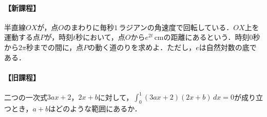 \documentclass[../../main.tex]{subfiles}
\begin{document}
\paragraph{【新課程】}
半直線$OX$が，点$O$のまわりに毎秒$1\,\text{ラジアン}$の角速度で回転している．$OX$上を運動する点$P$が，時刻$t$秒において，点$O$から$e^{2t}\,\text{cm}$の距離にあるという．時刻$0$秒から$2\pi$秒までの間に，点$P$の動く道のりを求めよ．ただし，$e$は自然対数の底である．

\paragraph{【旧課程】}
二つの一次式$3ax+2$，$2x+b$に対して，$\displaystyle\int_0^1(3ax+2)(2x+b)\,dx=0$が成り立つとき，$a+b$はどのような範囲にあるか．
\end{document}

